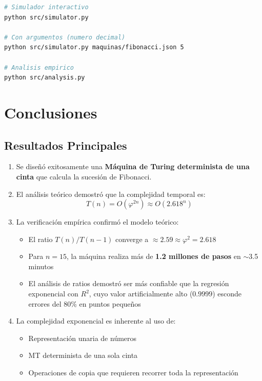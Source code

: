 \documentclass[12pt,a4paper]{article}
\begin{document}
\begin{lstlisting}[language=bash,caption={Comandos de ejecución}]
# Simulador interactivo
python src/simulator.py

# Con argumentos (numero decimal)
python src/simulator.py maquinas/fibonacci.json 5

# Analisis empirico
python src/analysis.py
\end{lstlisting}

\newpage

\section{Conclusiones}

\subsection{Resultados Principales}

\begin{enumerate}
    \item Se diseñó exitosamente una \textbf{Máquina de Turing determinista de una cinta} que calcula la sucesión de Fibonacci.
    
    \item El análisis teórico demostró que la complejidad temporal es:
    $$\boxed{T(n) = O(\varphi^{2n}) \approx O(2.618^n)}$$
    
    \item La verificación empírica confirmó el modelo teórico:
    \begin{itemize}
        \item El ratio $T(n)/T(n-1)$ converge a $\approx 2.59 \approx \varphi^2 = 2.618$
        \item Para $n=15$, la máquina realiza más de \textbf{1.2 millones de pasos} en $\sim$3.5 minutos
        \item El análisis de ratios demostró ser más confiable que la regresión exponencial con $R^2$, cuyo valor artificialmente alto ($0.9999$) esconde errores del 80\% en puntos pequeños
    \end{itemize}
    
    \item La complejidad exponencial es inherente al uso de:
    \begin{itemize}
        \item Representación unaria de números
        \item MT determinista de una sola cinta
        \item Operaciones de copia que requieren recorrer toda la representación
    \end{itemize}
\end{enumerate}
\end{document}
